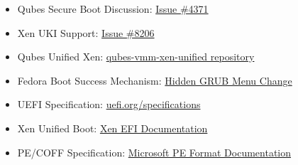 \documentclass[12pt, a4paper]{article}
\begin{document}
\begin{itemize}
    \item Qubes Secure Boot Discussion: \href{https://github.com/QubesOS/qubes-issues/issues/4371}{Issue \#4371}
    \item Xen UKI Support: \href{https://github.com/QubesOS/qubes-issues/issues/8206}{Issue \#8206}
    \item Qubes Unified Xen: \href{https://github.com/QubesOS/qubes-vmm-xen-unified}{qubes-vmm-xen-unified repository}
    \item Fedora Boot Success Mechanism: \href{https://fedoraproject.org/wiki/Changes/HiddenGrubMenu}{Hidden GRUB Menu Change}
    \item UEFI Specification: \href{https://uefi.org/specifications}{uefi.org/specifications}
    \item Xen Unified Boot: \href{https://xenbits.xen.org/docs/unstable/misc/efi.html}{Xen EFI Documentation}
    \item PE/COFF Specification: \href{https://learn.microsoft.com/en-us/windows/win32/debug/pe-format}{Microsoft PE Format Documentation}
\end{itemize}
\end{document}
